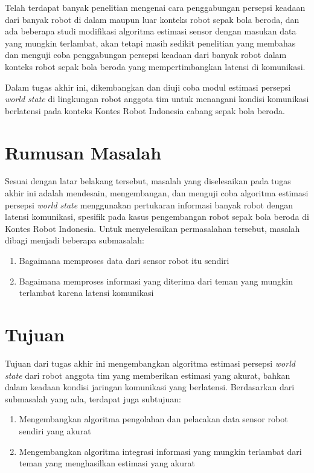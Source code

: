 Telah terdapat banyak penelitian mengenai cara penggabungan persepsi keadaan dari banyak robot di dalam maupun luar konteks robot sepak bola beroda, dan ada beberapa studi modifikasi algoritma estimasi sensor dengan masukan data yang mungkin terlambat, akan tetapi masih sedikit penelitian yang membahas dan menguji coba penggabungan persepsi keadaan dari banyak robot dalam konteks robot sepak bola beroda yang mempertimbangkan latensi di komunikasi.

Dalam tugas akhir ini, dikembangkan dan diuji coba modul estimasi persepsi \textit{world state} di lingkungan robot anggota tim untuk menangani kondisi komunikasi berlatensi pada konteks Kontes Robot Indonesia cabang sepak bola beroda.

\section{Rumusan Masalah}

Sesuai dengan latar belakang tersebut, masalah yang diselesaikan pada tugas akhir ini adalah mendesain, mengembangan, dan menguji coba algoritma estimasi persepsi \textit{world state} menggunakan pertukaran informasi banyak robot dengan latensi komunikasi, spesifik pada kasus pengembangan robot sepak bola beroda di Kontes Robot Indonesia. Untuk menyelesaikan permasalahan tersebut, masalah dibagi menjadi beberapa submasalah:

\begin{enumerate}
    \item Bagaimana memproses data dari sensor robot itu sendiri
    \item Bagaimana memproses informasi yang diterima dari teman yang mungkin terlambat karena latensi komunikasi
\end{enumerate}

\section{Tujuan}

Tujuan dari tugas akhir ini mengembangkan algoritma estimasi persepsi \textit{world state} dari robot anggota tim yang memberikan estimasi yang akurat, bahkan dalam keadaan kondisi jaringan komunikasi yang berlatensi. Berdasarkan dari submasalah yang ada, terdapat juga subtujuan:

\begin{enumerate}
    \item Mengembangkan algoritma pengolahan dan pelacakan data sensor robot sendiri yang akurat
    \item Mengembangkan algoritma integrasi informasi yang mungkin terlambat dari teman yang menghasilkan estimasi yang akurat
\end{enumerate}

